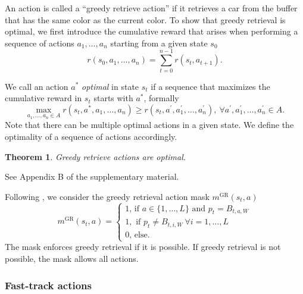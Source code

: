 \documentclass[11pt]{elsarticle}
\newtheorem{thm}{Theorem}
\begin{document}

An action is called a ``greedy retrieve action'' if it retrieves a car from the buffer that has the same color as the current color. To show that greedy retrieval is optimal, we first introduce the cumulative reward that arises when performing a sequence of actions $a_1,\dots, a_n$ starting from a given state $s_0$ 
\begin{equation}
r(s_0,a_1,\dots, a_n) = \sum_{t=0}^{n-1}r(s_t,a_{t+1}).\label{eqn:cum_reward}
\end{equation}

We call an action $a^*$ \emph{optimal} in state $s_t$ if a sequence that maximizes the cumulative reward in $s_t$ starts with $a^*$, formally 
\begin{equation}
\max_{a_1,\dots, a_n\in A}r(s_t,a^*,a_1,\dots, a_n )\geq  r(s_t,a^\prime,a^\prime_1,\dots, a^\prime_n), \ \forall a^\prime, a^\prime_1,\dots, a^\prime_n \in A.
\end{equation}
Note that there can be multiple optimal actions in a given state. We define the optimality of a sequence of actions accordingly.

\begin{thm}
\label{thm:greedy}
Greedy retrieve actions are optimal.
\end{thm}
\begin{pf}
See Appendix B of the supplementary material.
\end{pf}
Following , we consider the greedy retrieval action mask $m^{\text{GR}}(s_t,a)$
\begin{equation}
m^{\text{GR}}(s_t,a)=\begin{cases}
1\text{, if } a\in\{1,\dots,L\} \text{ and } p_t=B_{t,a,W} \\
1, \text{ if } p_t\neq B_{t,i,W}\ \forall i=1,\dots, L \\
0\text{, else}.
\end{cases}
\end{equation} 
The mask enforces greedy retrieval if it is possible. If greedy retrieval is not possible, the mask allows all actions.

\subsubsection*{Fast-track actions}
\end{document}
